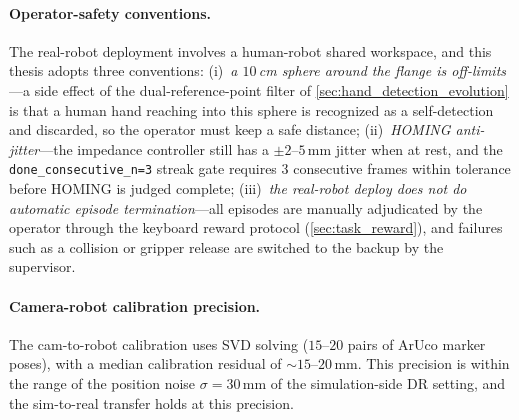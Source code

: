 \paragraph{Operator-safety conventions.} The real-robot deployment involves a human-robot shared workspace, and this thesis adopts three conventions: (i)~\emph{a $10$\,cm sphere around the flange is off-limits}---a side effect of the dual-reference-point filter of \cref{sec:hand_detection_evolution} is that a human hand reaching into this sphere is recognized as a self-detection and discarded, so the operator must keep a safe distance; (ii)~\emph{HOMING anti-jitter}---the impedance controller still has a $\pm 2$--$5$\,mm jitter when at rest, and the \texttt{done\_consecutive\_n=3} streak gate requires $3$ consecutive frames within tolerance before HOMING is judged complete; (iii)~\emph{the real-robot deploy does not do automatic episode termination}---all episodes are manually adjudicated by the operator through the keyboard reward protocol (\cref{sec:task_reward}), and failures such as a collision or gripper release are switched to the backup by the supervisor.

\paragraph{Camera-robot calibration precision.} The cam-to-robot calibration uses SVD solving ($15$--$20$ pairs of ArUco marker poses), with a median calibration residual of $\sim 15$--$20$\,mm. This precision is within the range of the position noise $\sigma = 30$\,mm of the simulation-side DR setting, and the sim-to-real transfer holds at this precision.

